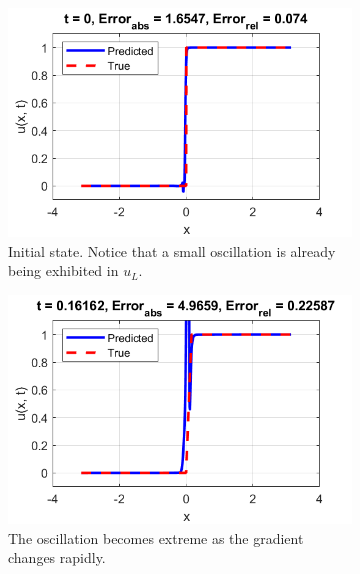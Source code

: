 \documentclass{myproject}
\begin{document}
\begin{figure}
\centering
    \begin{subfigure}{.48\textwidth}
        \centering
        \includegraphics[width=1.0\textwidth]{t0_NN_rarefraction.png}
        \caption{Initial state. Notice that a small oscillation is already being exhibited in $u_L$.}
    \end{subfigure}\hfill
    \begin{subfigure}{.48\textwidth}
        \centering
        \includegraphics[width=1\textwidth]{t016_NN_rarefraction.png}
        \caption{The oscillation becomes extreme as the gradient changes rapidly.}
    \end{subfigure}
    \begin{subfigure}{.48\textwidth}
        \centering

\end{subfigure}
\end{figure}
\end{document}
